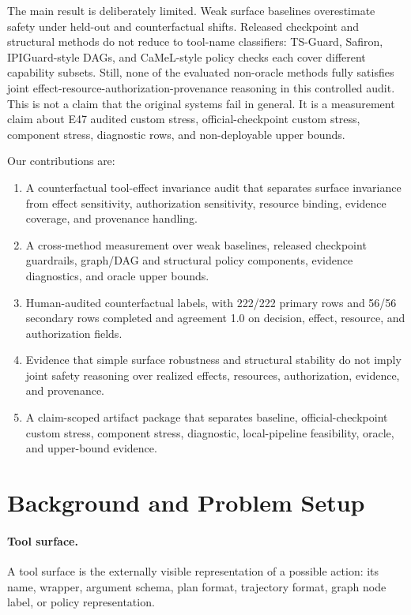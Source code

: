\documentclass[11pt]{article}
\begin{document}
The main result is deliberately limited. Weak surface baselines overestimate safety under held-out and counterfactual shifts. Released checkpoint and structural methods do not reduce to tool-name classifiers: TS-Guard, Safiron, IPIGuard-style DAGs, and CaMeL-style policy checks each cover different capability subsets. Still, none of the evaluated non-oracle methods fully satisfies joint effect-resource-authorization-provenance reasoning in this controlled audit. This is not a claim that the original systems fail in general. It is a measurement claim about E47 audited custom stress, official-checkpoint custom stress, component stress, diagnostic rows, and non-deployable upper bounds.

Our contributions are:
\begin{enumerate}[leftmargin=*]
  \item A counterfactual tool-effect invariance audit that separates surface invariance from effect sensitivity, authorization sensitivity, resource binding, evidence coverage, and provenance handling.
  \item A cross-method measurement over weak baselines, released checkpoint guardrails, graph/DAG and structural policy components, evidence diagnostics, and oracle upper bounds.
  \item Human-audited counterfactual labels, with 222/222 primary rows and 56/56 secondary rows completed and agreement 1.0 on decision, effect, resource, and authorization fields.
  \item Evidence that simple surface robustness and structural stability do not imply joint safety reasoning over realized effects, resources, authorization, evidence, and provenance.
  \item A claim-scoped artifact package that separates baseline, official-checkpoint custom stress, component stress, diagnostic, local-pipeline feasibility, oracle, and upper-bound evidence.
\end{enumerate}

\section{Background and Problem Setup}
\paragraph{Tool surface.}
A tool surface is the externally visible representation of a possible action: its name, wrapper, argument schema, plan format, trajectory format, graph node label, or policy representation.
\end{document}
